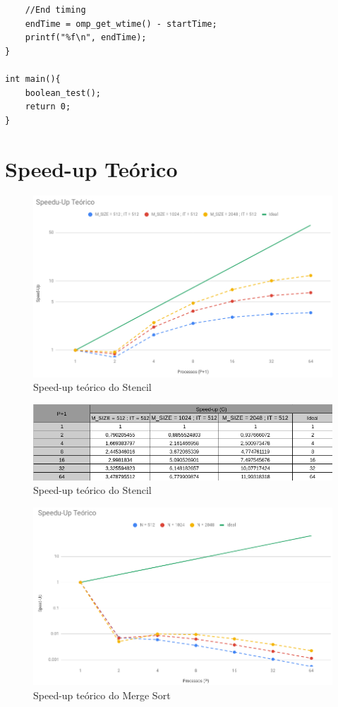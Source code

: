 \documentclass{article}
\begin{document}
\begin{appendix}
\begin{verbatim}
    //End timing
    endTime = omp_get_wtime() - startTime;
    printf("%f\n", endTime);
}

int main(){
    boolean_test();
    return 0;
}
\end{verbatim}

\section{Speed-up Teórico}
\begin{figure}[H]
    \centering
    \includegraphics[width=15cm]{Pictures/TheoreticalGraph1.png}
    \caption{Speed-up teórico do Stencil}
    \label{theoretical_stencil}
\end{figure}

\begin{figure}[H]
    \centering
    \includegraphics[width=15cm]{Pictures/TheoreticalTbl1.png}
    \caption{Speed-up teórico do Stencil}
\end{figure}

\begin{figure}[H]
    \centering
    \includegraphics[width=15cm]{Pictures/TheoreticalGraph2.png}
    \caption{Speed-up teórico do Merge Sort}
    \label{theoretical_mergeSort}
\end{figure}


\end{appendix}
\end{document}
